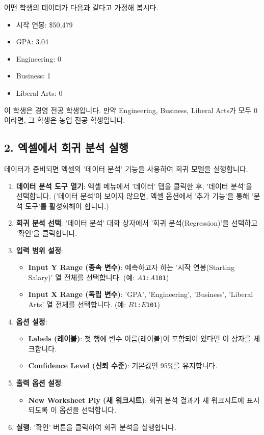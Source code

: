 \documentclass[11pt,a4paper]{book}
\theoremstyle{definition}
\begin{document}
\begin{tcolorbox}[example={더미 변수 코딩 예시}]
어떤 학생의 데이터가 다음과 같다고 가정해 봅시다.
\begin{itemize}
    \item 시작 연봉: \$50,479
    \item GPA: 3.04
    \item Engineering: 0
    \item Business: 1
    \item Liberal Arts: 0
\end{itemize}
이 학생은 경영 전공 학생입니다. 만약 Engineering, Business, Liberal Arts가 모두 0이라면, 그 학생은 농업 전공 학생입니다.
\end{tcolorbox}

\subsection{2. 엑셀에서 회귀 분석 실행}

데이터가 준비되면 엑셀의 '데이터 분석' 기능을 사용하여 회귀 모델을 실행합니다.

\begin{enumerate}
    \item \textbf{데이터 분석 도구 열기}: 엑셀 메뉴에서 '데이터' 탭을 클릭한 후, '데이터 분석'을 선택합니다. ('데이터 분석'이 보이지 않으면, 엑셀 옵션에서 '추가 기능'을 통해 '분석 도구'를 활성화해야 합니다.)
    \item \textbf{회귀 분석 선택}: '데이터 분석' 대화 상자에서 '회귀 분석(Regression)'을 선택하고 '확인'을 클릭합니다.
    \item \textbf{입력 범위 설정}:
    \begin{itemize}
        \item \textbf{Input Y Range (종속 변수)}: 예측하고자 하는 '시작 연봉(Starting Salary)' 열 전체를 선택합니다. (예: \texttt{$A$1:$A$101})
        \item \textbf{Input X Range (독립 변수)}: 'GPA', 'Engineering', 'Business', 'Liberal Arts' 열 전체를 선택합니다. (예: \texttt{$B$1:$E$101})
    \end{itemize}
    \item \textbf{옵션 설정}:
    \begin{itemize}
        \item \textbf{Labels (레이블)}: 첫 행에 변수 이름(레이블)이 포함되어 있다면 이 상자를 체크합니다.
        \item \textbf{Confidence Level (신뢰 수준)}: 기본값인 95\%를 유지합니다.
    \end{itemize}
    \item \textbf{출력 옵션 설정}:
    \begin{itemize}
        \item \textbf{New Worksheet Ply (새 워크시트)}: 회귀 분석 결과가 새 워크시트에 표시되도록 이 옵션을 선택합니다.
    \end{itemize}
    \item \textbf{실행}: '확인' 버튼을 클릭하여 회귀 분석을 실행합니다.
\end{enumerate}
\end{document}

